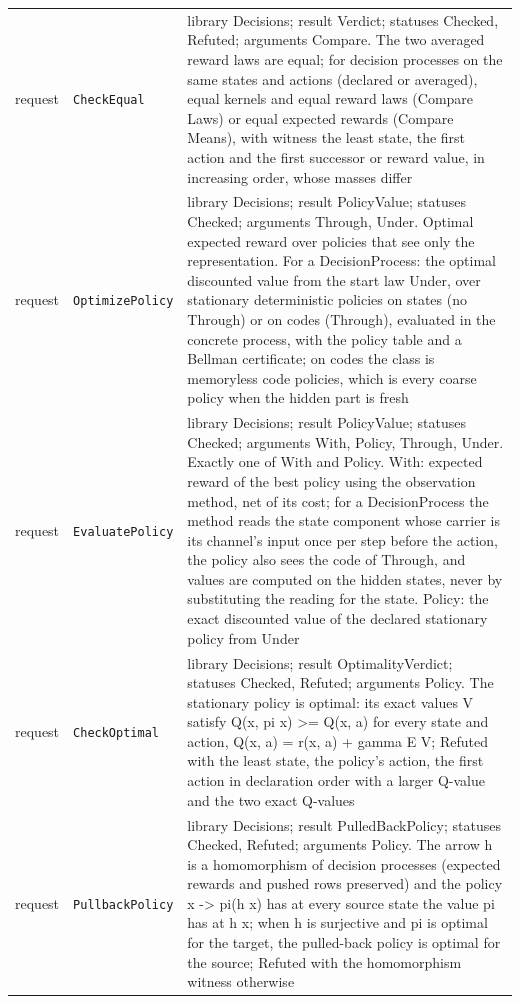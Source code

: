 \documentclass[11pt]{article}
\newcommand{\code}[1]{\texttt{#1}}
\theoremstyle{definition}
\theoremstyle{plain}
\begin{document}
\begin{footnotesize}
\begin{longtable}{>{\raggedright\arraybackslash}p{2.2cm}>{\raggedright\arraybackslash}p{4.1cm}>{\raggedright\arraybackslash}p{7.9cm}}
request & \code{CheckEqual} & library Decisions; result Verdict; statuses Checked, Refuted; arguments Compare. The two averaged reward laws are equal; for decision processes on the same states and actions (declared or averaged), equal kernels and equal reward laws (Compare Laws) or equal expected rewards (Compare Means), with witness the least state, the first action and the first successor or reward value, in increasing order, whose masses differ\\
request & \code{OptimizePolicy} & library Decisions; result PolicyValue; statuses Checked; arguments Through, Under. Optimal expected reward over policies that see only the representation.  For a DecisionProcess:\allowbreak{} the optimal discounted value from the start law Under, over stationary deterministic policies on states (no Through) or on codes (Through), evaluated in the concrete process, with the policy table and a Bellman certificate; on codes the class is memoryless code policies, which is every coarse policy when the hidden part is fresh\\
request & \code{EvaluatePolicy} & library Decisions; result PolicyValue; statuses Checked; arguments With, Policy, Through, Under. Exactly one of With and Policy.  With:\allowbreak{} expected reward of the best policy using the observation method, net of its cost; for a DecisionProcess the method reads the state component whose carrier is its channel's input once per step before the action, the policy also sees the code of Through, and values are computed on the hidden states, never by substituting the reading for the state.  Policy:\allowbreak{} the exact discounted value of the declared stationary policy from Under\\
request & \code{CheckOptimal} & library Decisions; result OptimalityVerdict; statuses Checked, Refuted; arguments Policy. The stationary policy is optimal:\allowbreak{} its exact values V satisfy Q(x, pi x) >= Q(x, a) for every state and action, Q(x, a) = r(x, a) + gamma E V; Refuted with the least state, the policy's action, the first action in declaration order with a larger Q-value and the two exact Q-values\\
request & \code{PullbackPolicy} & library Decisions; result PulledBackPolicy; statuses Checked, Refuted; arguments Policy. The arrow h is a homomorphism of decision processes (expected rewards and pushed rows preserved) and the policy x -> pi(h x) has at every source state the value pi has at h x; when h is surjective and pi is optimal for the target, the pulled-back policy is optimal for the source; Refuted with the homomorphism witness otherwise\\

\end{longtable}
\end{footnotesize}
\end{document}
